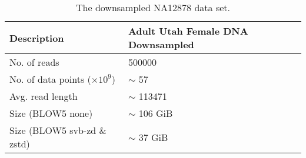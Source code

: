 \begin{table}
    \caption{\label{tab:data}The downsampled NA12878 data set.}
	\begin{tabular}{|l|m{4cm}|}
        \hline
        Description & Adult Utah Female DNA Downsampled\\
        \hline
	No. of reads & \num{500000}\\
	No. of data points ($\times 10^9$) & $\sim$ 57\\
	Avg. read length & $\sim$ \num{113471}\\
    Size (BLOW5 none) & $\sim$ 106 GiB\\
    Size (BLOW5 svb-zd \& zstd) & $\sim$ 37 GiB\\
	\hline
    \end{tabular}
\end{table}
